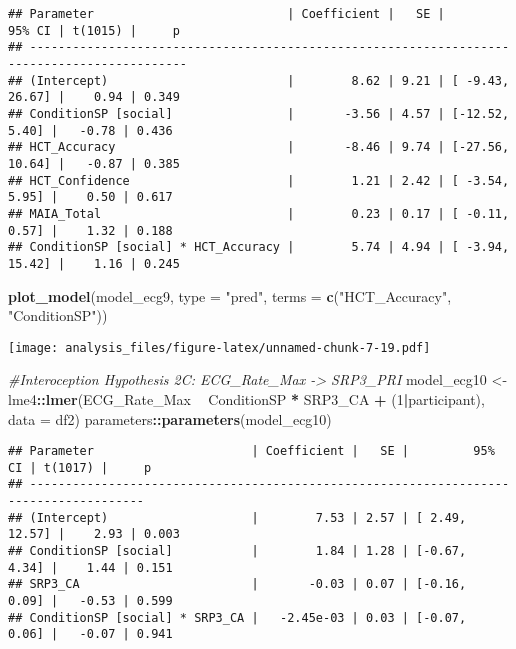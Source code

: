\documentclass[
]{article}
\newenvironment{Shaded}{\begin{snugshade}}{\end{snugshade}}
\newcommand{\CommentTok}[1]{\textcolor[rgb]{0.56,0.35,0.01}{\textit{#1}}}
\newcommand{\DataTypeTok}[1]{\textcolor[rgb]{0.13,0.29,0.53}{#1}}
\newcommand{\DecValTok}[1]{\textcolor[rgb]{0.00,0.00,0.81}{#1}}
\newcommand{\KeywordTok}[1]{\textcolor[rgb]{0.13,0.29,0.53}{\textbf{#1}}}
\newcommand{\NormalTok}[1]{#1}
\newcommand{\OperatorTok}[1]{\textcolor[rgb]{0.81,0.36,0.00}{\textbf{#1}}}
\newcommand{\StringTok}[1]{\textcolor[rgb]{0.31,0.60,0.02}{#1}}
\begin{document}
\begin{verbatim}
## Parameter                           | Coefficient |   SE |          95% CI | t(1015) |     p
## --------------------------------------------------------------------------------------------
## (Intercept)                         |        8.62 | 9.21 | [ -9.43, 26.67] |    0.94 | 0.349
## ConditionSP [social]                |       -3.56 | 4.57 | [-12.52,  5.40] |   -0.78 | 0.436
## HCT_Accuracy                        |       -8.46 | 9.74 | [-27.56, 10.64] |   -0.87 | 0.385
## HCT_Confidence                      |        1.21 | 2.42 | [ -3.54,  5.95] |    0.50 | 0.617
## MAIA_Total                          |        0.23 | 0.17 | [ -0.11,  0.57] |    1.32 | 0.188
## ConditionSP [social] * HCT_Accuracy |        5.74 | 4.94 | [ -3.94, 15.42] |    1.16 | 0.245
\end{verbatim}

\begin{Shaded}
\begin{Highlighting}[]
\KeywordTok{plot_model}\NormalTok{(model_ecg9, }\DataTypeTok{type =} \StringTok{"pred"}\NormalTok{, }\DataTypeTok{terms =} \KeywordTok{c}\NormalTok{(}\StringTok{"HCT_Accuracy"}\NormalTok{, }\StringTok{"ConditionSP"}\NormalTok{))}
\end{Highlighting}
\end{Shaded}

\texttt{[image: analysis\_files/figure-latex/unnamed-chunk-7-19.pdf]}

\begin{Shaded}
\begin{Highlighting}[]
\CommentTok{#Interoception Hypothesis 2C: ECG_Rate_Max -> SRP3_PRI}
\NormalTok{model_ecg10 <-}\StringTok{ }\NormalTok{lme4}\OperatorTok{::}\KeywordTok{lmer}\NormalTok{(ECG_Rate_Max }\OperatorTok{~}\StringTok{ }\NormalTok{ConditionSP }\OperatorTok{*}\StringTok{ }\NormalTok{SRP3_CA }\OperatorTok{+}\StringTok{ }\NormalTok{(}\DecValTok{1}\OperatorTok{|}\NormalTok{participant), }\DataTypeTok{data =}\NormalTok{ df2)}
\NormalTok{parameters}\OperatorTok{::}\KeywordTok{parameters}\NormalTok{(model_ecg10)}
\end{Highlighting}
\end{Shaded}

\begin{verbatim}
## Parameter                      | Coefficient |   SE |         95% CI | t(1017) |     p
## --------------------------------------------------------------------------------------
## (Intercept)                    |        7.53 | 2.57 | [ 2.49, 12.57] |    2.93 | 0.003
## ConditionSP [social]           |        1.84 | 1.28 | [-0.67,  4.34] |    1.44 | 0.151
## SRP3_CA                        |       -0.03 | 0.07 | [-0.16,  0.09] |   -0.53 | 0.599
## ConditionSP [social] * SRP3_CA |   -2.45e-03 | 0.03 | [-0.07,  0.06] |   -0.07 | 0.941
\end{verbatim}
\end{document}

